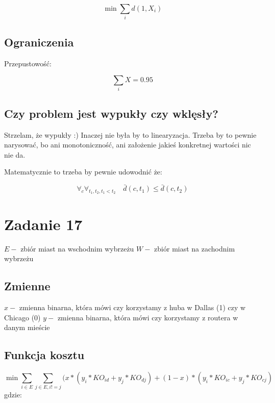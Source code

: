 \documentclass{article}
\begin{document}
\begin{equation}
  \min \sum_{i} d(1,X_i)
\end{equation}

\subsection{Ograniczenia}

Przepustowość:

\begin{equation}
  \sum_{i} X = 0.95
\end{equation}


\subsection{Czy problem jest wypukły czy wklęsły?}
Strzelam, że wypukły :) Inaczej nie była by to linearyzacja. Trzeba by to pewnie
narysować, bo ani monotoniczność, ani założenie jakieś konkretnej wartości nic nie da.

Matematycznie to trzeba by pewnie udowodnić że:

\begin{equation}
  \forall_{c} \forall_{t_1, t_2, t_1 < t_2} \quad \bar {d}(c, t_1) \leq \bar{d}(c, t_2)
\end{equation}


\section{Zadanie 17}

$E -$ zbiór miast na wschodnim wybrzeżu
$W -$ zbiór miast na zachodnim wybrzeżu



\subsection{Zmienne}

$x -$ zmienna binarna, która mówi czy korzystamy z huba w Dallas (1) czy w Chicago (0)
$y -$ zmienna binarna, która mówi czy korzystamy z routera w danym mieście

\subsection{Funkcja kosztu}
\begin{equation}
  \min \sum_{i \in E } \sum_{j \in E, i!=j}(x*(y_i * KO_{id} + y_j*KO_{dj}) + (1-x) * (y_i*KO_{ic} + y_j*KO_{cj})
\end{equation}
gdzie:
\end{document}
